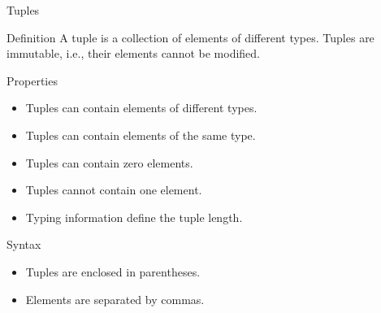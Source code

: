 \begin{frame}{Tuples}
    \begin{block}{Definition}
        A tuple is a collection of elements of different types. Tuples are immutable, i.e., their elements cannot be modified.
    \end{block}
    \begin{block}{Properties}
        \begin{itemize}
            \item Tuples can contain elements of different types.
            \item Tuples can contain elements of the same type.
            \item Tuples can contain zero elements.
            \item Tuples cannot contain one element.
            \item Typing information define the tuple length.
        \end{itemize}
    \end{block}
    \begin{block}{Syntax}
        \begin{itemize}
            \item Tuples are enclosed in parentheses.
            \item Elements are separated by commas.
        \end{itemize}
    \end{block}
\end{frame}